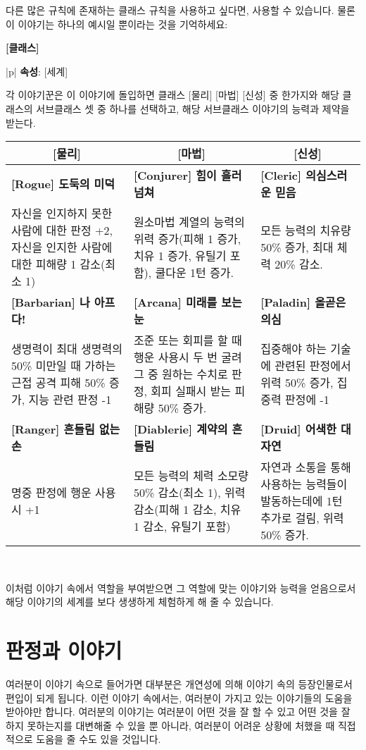 \documentclass[12pt]{report}
\newenvironment{story}[2]
{\begin{center}
		{\large \textbf{[#1]}}\\[1ex]
		\begin{tabular}{|p{\textwidth}|}
			\hline
			\textbf{속성}: #2
			\\
			\hline
		}
		{ 
			\\\hline
		\end{tabular}
	\end{center}
}
\newcommand{\world}[1]{{\nanumpen \large #1 \par}\bigskip}
\begin{document}
	다른 많은 규칙에 존재하는 클래스 규칙을 사용하고 싶다면, 사용할 수 있습니다. 물론 이 이야기는 하나의 예시일 뿐이라는 것을 기억하세요:
	\begin{story}{클래스}{[세계]}
		각 이야기꾼은 이 이야기에 돌입하면 클래스 [물리] [마법] [신성] 중 한가지와 해당 클래스의 서브클래스 셋 중 하나를 선택하고, 해당 서브클래스 이야기의 능력과 제약을 받는다.
		
		\medskip
		
		\begin{tabularx}{\textwidth}{X|X|X}
			\multicolumn{1}{c|}{\textbf{[물리]}} & \multicolumn{1}{c|}{\textbf{[마법]}} & \multicolumn{1}{c}{\textbf{[신성]}} \\ \hline
			\textbf{[Rogue] 도둑의 미덕} & \textbf{[Conjurer] 힘이 흘러넘쳐} & \textbf{[Cleric] 의심스러운 믿음} \\
			{자신을 인지하지 못한 사람에 대한 판정 +2, 자신을 인지한 사람에 대한 피해량 1 감소(최소 1)} & {원소마법 계열의 능력의 위력 증가(피해 1 증가, 치유 1 증가, 유틸기 포함), 쿨다운 1턴 증가.} & {모든 능력의 치유량 50\% 증가, 최대 체력 20\% 감소.} \\\hline
			\textbf{[Barbarian] 나 아프다!} & \textbf{[Arcana] 미래를 보는 눈} & \textbf{[Paladin] 올곧은 의심} \\ 
			{생명력이 최대 생명력의 50\% 미만일 때 가하는 근접 공격 피해 50\% 증가, 지능 관련 판정 -1} & {조준 또는 회피를 할 때 행운 사용시 두 번 굴려 그 중 원하는 수치로 판정, 회피 실패시 받는 피해량 50\% 증가.} & {집중해야 하는 기술에 관련된 판정에서 위력 50\% 증가, 집중력 판정에 -1} \\ \hline
			\textbf{[Ranger] 흔들림 없는 손} & \textbf{[Diablerie] 계약의 흔들림} & \textbf{[Druid] 어색한 대자연} \\ 
			{명중 판정에 행운 사용시 +1} & {모든 능력의 체력 소모량 50\% 감소(최소 1), 위력 감소(피해 1 감소, 치유 1 감소, 유틸기 포함)} & {자연과 소통을 통해 사용하는 능력들이 발동하는데에 1턴 추가로 걸림, 위력 50\% 증가.}
		\end{tabularx}
	\end{story}
	
	이처럼 이야기 속에서 역할을 부여받으면 그 역할에 맞는 이야기와 능력을 얻음으로서 해당 이야기의 세계를 보다 생생하게 체험하게 해 줄 수 있습니다.
	
	\chapter{판정과 이야기}
	\world{여러분이 이야기 속으로 들어가면 대부분은 개연성에 의해 이야기 속의 등장인물로서 편입이 되게 됩니다. 이런 이야기 속에서는, 여러분이 가지고 있는 이야기들의 도움을 받아야만 합니다. 여러분의 이야기는 여러분이 어떤 것을 잘 할 수 있고 어떤 것을 잘 하지 못하는지를 대변해줄 수 있을 뿐 아니라, 여러분이 어려운 상황에 처했을 때 직접적으로 도움을 줄 수도 있을 것입니다.}
	
\end{document}
